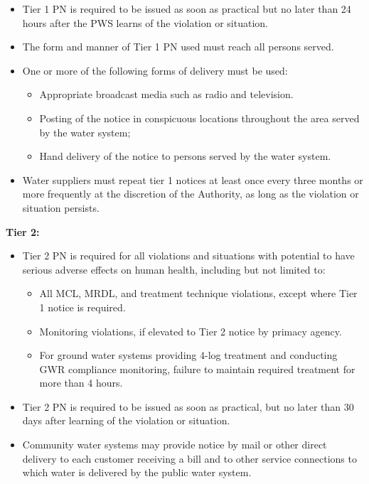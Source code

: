 \begin{itemize}
\begin{itemize}
\begin{itemize}
\end{itemize}
\item Tier 1 PN is required to be issued as soon as practical but no later than 24 hours after the PWS learns of the violation or situation.
\item The form and manner of Tier 1 PN used must reach all persons served.
\item One or more of the following forms of delivery must be used:
\begin{itemize}
\item Appropriate broadcast media such as radio and television.
\item Posting of the notice in conspicuous locations throughout the area served by the water system;
\item Hand delivery of the notice to persons served by the water system.
\end{itemize}
\item Water suppliers must repeat tier 1 notices at least once every three months or more frequently at the discretion of the Authority, as long as the violation or situation persists.
\end{itemize}
\end{itemize}
\vspace{0.2cm}
\textbf{Tier 2:}
\begin{itemize}
\item Tier 2 PN is required for all violations and situations with potential to have serious adverse effects on human health, including but not limited to:
\begin{itemize}
\item All MCL, MRDL, and treatment technique violations, except where Tier 1 notice is required.
\item Monitoring violations, if elevated to Tier 2 notice by primacy agency.
\item For	ground	water	systems	providing	4-log	treatment	and	conducting	GWR	compliance monitoring, failure to maintain required treatment for more than 4 hours.
\end{itemize}
\item Tier 2 PN is required to be issued as soon as practical, but no later than 30 days after learning of the violation or situation.
\item Community water systems may provide notice by mail or other direct delivery to each customer receiving a bill and to other service connections to which water is delivered by the public water system.
\end{itemize}

